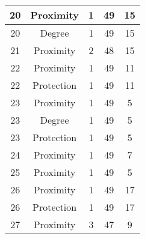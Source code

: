 \documentclass[results.tex]{subfiles}
\begin{document}
\begin{center}
\begin{tabular}{| c || c | c | c | c |}
            \hline
            20                      & Proximity                    & 1                      & 49                      & 15                   \\
            \hline
            20                      & Degree                       & 1                      & 49                      & 15                   \\
            \hline
            21                      & Proximity                    & 2                      & 48                      & 15                   \\
            \hline
            22                      & Proximity                    & 1                      & 49                      & 11                   \\
            \hline
            22                      & Protection                   & 1                      & 49                      & 11                   \\
            \hline
            23                      & Proximity                    & 1                      & 49                      & 5                    \\
            \hline
            23                      & Degree                       & 1                      & 49                      & 5                    \\
            \hline
            23                      & Protection                   & 1                      & 49                      & 5                    \\
            \hline
            24                      & Proximity                    & 1                      & 49                      & 7                    \\
            \hline
            25                      & Proximity                    & 1                      & 49                      & 5                    \\
            \hline
            26                      & Proximity                    & 1                      & 49                      & 17                   \\
            \hline
            26                      & Protection                   & 1                      & 49                      & 17                   \\
            \hline
            27                      & Proximity                    & 3                      & 47                      & 9                    \\

\end{tabular}
\end{center}
\end{document}

